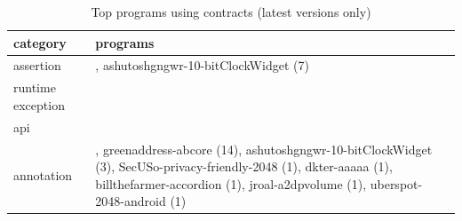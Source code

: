 \begin{table}[]
\centering
\caption{Top programs using contracts (latest versions only)}
\label{tab:topusers}
\begin{tabular}{|p{2.0cm}|p{6.0cm}|} \hline
   category & programs \\ \hline
assertion & , ashutoshgngwr-10-bitClockWidget (7) \\ 
runtime exception &  \\ 
api &  \\ 
annotation & , greenaddress-abcore (14), ashutoshgngwr-10-bitClockWidget (3), SecUSo-privacy-friendly-2048 (1), dkter-aaaaa (1), billthefarmer-accordion (1), jroal-a2dpvolume (1), uberspot-2048-android (1) \\ 
\hline
\end{tabular}
\end{table}
